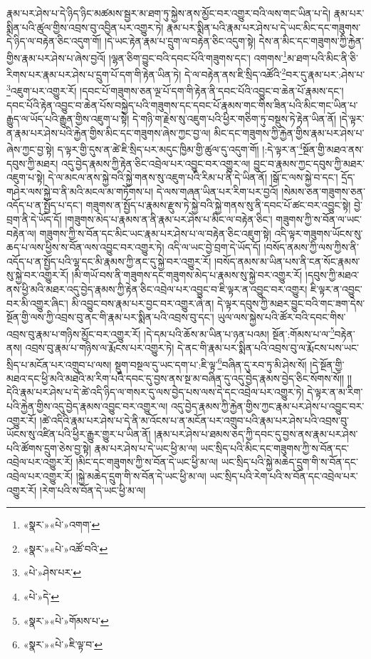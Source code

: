 རྣམ་པར་ཤེས་པ་དེ་ཉིད་ཉིང་མཚམས་སྦྱར་མ་ཐག་ཏུ་སྐྱེས་ནས་མྱོང་བར་འགྱུར་བའི་ལས་གང་ཡིན་པ་དེ། རྣམ་པར་སྨིན་པའི་ཚུལ་གྱིས་འབྲས་བུ་འབྱིན་པར་འགྱུར་ཏེ། རྣམ་པར་སྨིན་པའི་རྣམ་པར་ཤེས་པ་དེ་ཡང་མིང་དང་གཟུགས་དེ་ཉིད་ལ་བརྟེན་ཅིང་འདུག་གོ། །དེ་ཡང་རྟེན་རྣམ་པ་དྲུག་ལ་བརྟེན་ཅིང་འདུག་སྟེ། དེས་ན་མིང་དང་གཟུགས་ཀྱི་རྐྱེན་གྱིས་རྣམ་པར་ཤེས་པ་ཞེས་བྱའོ། །ལྷན་ཅིག་བྱུང་བའི་དབང་པོའི་གཟུགས་དང་། འགགས་\footnote{«སྣར་»«པེ་»འགག་}མ་ཐག་པའི་མིང་ནི་ཅི་རིགས་པར་རྣམ་པར་ཤེས་པ་དྲུག་པོ་དག་གི་རྟེན་ཡིན་ཏེ། དེ་ལ་བརྟེན་ནས་ཇི་སྲིད་འཚོའི་\footnote{«སྣར་»«པེ་»འཚོ་བའི་}བར་དུ་རྣམ་པར་:ཤེས་པ་\footnote{«པེ་»ཤེས་པར་}འཇུག་པར་འགྱུར་རོ། །དབང་པོ་གཟུགས་ཅན་ལྔ་པོ་དག་གི་རྟེན་ནི་དབང་པོའི་འབྱུང་བ་ཆེན་པོ་རྣམས་དང་། དབང་པོའི་རྟེན་འབྱུང་བ་ཆེན་པོས་བསྐྱེད་པའི་གཟུགས་དང་དབང་པོ་རྣམས་གང་གིས་ཟིན་པའི་མིང་གང་ཡིན་པ་རྒྱུད་ལ་ཡོད་པའི་རྒྱུན་གྱིས་འཇུག་པ་སྟེ། དེ་གཉི་ག་རྗེས་སུ་འཇུག་པའི་ཕྱིར་གཅིག་ཏུ་བསྡུས་ཏེ་རྟེན་ཡིན་ནོ། །དེ་ལྟར་ན་རྣམ་པར་ཤེས་པའི་རྐྱེན་གྱིས་མིང་དང་གཟུགས་ཞེས་ཀྱང་བྱ་ལ། མིང་དང་གཟུགས་ཀྱི་རྐྱེན་གྱིས་རྣམ་པར་ཤེས་པ་ཞེས་ཀྱང་བྱ་སྟེ། ད་ལྟར་གྱི་དུས་ན་ཚེ་ཇི་སྲིད་པར་མདུང་ཁྱིམ་གྱི་ཚུལ་དུ་འདུག་གོ། །:དེ་ལྟར་ན་\footnote{«པེ་»དེ་}སྔོན་གྱི་མཐའ་ནས་དབུས་ཀྱི་མཐར། འདུ་བྱེད་རྣམས་ཀྱི་རྟེན་ཅིང་འབྲེལ་པར་འབྱུང་བར་འགྱུར་ལ། བྱུང་བ་རྣམས་ཀྱང་དབུས་ཀྱི་མཐར་འཇུག་པ་སྟེ། དེ་ལ་མངལ་ནས་སྐྱེ་བའི་སྐྱེ་གནས་སུ་འཇུག་པའི་རིམ་པ་ནི་དེ་ཡིན་ནོ། །སྒོ་ང་ལས་སྐྱེ་བ་དང་། དྲོད་གཤེར་ལས་སྐྱེ་བ་ནི་མའི་མངལ་མ་གཏོགས་པ། དེ་ལས་གཞན་ཡིན་པར་རིག་པར་བྱའོ། །སེམས་ཅན་གཟུགས་ཅན་འདོད་པ་ན་སྤྱོད་པ་དང་། གཟུགས་ན་སྤྱོད་པ་རྣམས་རྫུས་ཏེ་སྐྱེ་བའི་སྐྱེ་གནས་སུ་ནི་དབང་པོ་ཚང་བར་འབྱུང་སྟེ། བྱེ་བྲག་ནི་དེ་ཡོད་དོ། །གཟུགས་མེད་པ་རྣམས་ན་ནི་རྣམ་པར་ཤེས་པ་མིང་ལ་བརྟེན་ཅིང་། གཟུགས་ཀྱི་ས་བོན་ལ་ཡང་བརྟེན་ལ། གཟུགས་ཀྱི་ས་བོན་དང་མིང་ཡང་རྣམ་པར་ཤེས་པ་ལ་བརྟེན་ཅིང་འཇུག་སྟེ། འདི་ལྟར་གཟུགས་ཡོངས་སུ་ཆད་པ་ལས་ཕྱིས་ས་བོན་ལས་འབྱུང་བར་འགྱུར་ཏེ། འདི་ལ་ཡང་བྱེ་བྲག་དེ་ཡོད་དོ། །བསོད་ནམས་ཀྱི་ལས་ཀྱིས་ནི་འདོད་པ་ན་སྤྱོད་པའི་ལྷ་དང་མི་རྣམས་ཀྱི་ནང་དུ་སྐྱེ་བར་འགྱུར་རོ། །བསོད་ནམས་མ་ཡིན་པས་ནི་ངན་སོང་རྣམས་སུ་སྐྱེ་བར་འགྱུར་རོ། །མི་གཡོ་བས་ནི་གཟུགས་དང་གཟུགས་མེད་པ་རྣམས་སུ་སྐྱེ་བར་འགྱུར་རོ། །དབུས་ཀྱི་མཐའ་ནས་ཕྱི་མའི་མཐར་འདུ་བྱེད་རྣམས་ཀྱི་རྟེན་ཅིང་འབྲེལ་པར་འབྱུང་བ་ཇི་ལྟར་ན་འབྱུང་བར་འགྱུར། ཇི་ལྟར་ན་འབྱུང་བར་མི་འགྱུར་ཞིང་། མི་འབྱུང་བས་རྣམ་པར་བྱང་བར་འགྱུར་ཞེ་ན། དེ་ལྟར་དབུས་ཀྱི་མཐར་བྱུང་བའི་གང་ཟག་དེས་སྔོན་གྱི་ལས་ཀྱི་འབྲས་བུ་ནང་གི་རྣམ་པར་སྨིན་པའི་འབྲས་བུ་དང་། ཡུལ་ལས་སྐྱེས་པའི་ཚོར་བའི་དབང་གིས་འབྲས་བུ་རྣམ་པ་གཉིས་མྱོང་བར་འགྱུར་རོ། །དེ་དམ་པའི་ཆོས་མ་ཡིན་པ་ཉན་པའམ། སྔོན་:གོམས་པ་ལ་\footnote{«སྣར་»«པེ་»གོམས་པ་}བརྟེན་ནས། འབྲས་བུ་རྣམ་པ་གཉིས་ལ་རྨོངས་པར་འགྱུར་ཏེ། དེ་ནང་གི་རྣམ་པར་སྨིན་པའི་འབྲས་བུ་ལ་རྨོངས་པས་ཡང་སྲིད་པ་མངོན་པར་འགྲུབ་པ་ལས། སྡུག་བསྔལ་དུ་ཡང་དག་པ་:ཇི་ལྟ་\footnote{«སྣར་»«པེ་»ཇི་ལྟ་བ་}བཞིན་དུ་རབ་ཏུ་མི་ཤེས་སོ། །དེ་སྔོན་གྱི་མཐའ་དང་ཕྱི་མའི་མཐའི་མ་རིག་པའི་དབང་དུ་བྱས་ནས་སྔ་མ་བཞིན་དུ་འདུ་བྱེད་རྣམས་བྱེད་ཅིང་སོགས་སོ།། །།དེའི་རྣམ་པར་ཤེས་པ་དེ་ཚེ་འདི་ཉིད་ལ་གསར་དུ་ལས་བྱེད་པས་ལས་དེ་དང་འབྲེལ་པར་འགྱུར་ཏེ། དེ་ལྟར་ན་མ་རིག་པའི་རྐྱེན་གྱིས་འདུ་བྱེད་རྣམས་འབྱུང་བར་འགྱུར་ལ། འདུ་བྱེད་རྣམས་ཀྱི་རྐྱེན་གྱིས་ཀྱང་རྣམ་པར་ཤེས་པ་འབྱུང་བར་འགྱུར་རོ། །ཚེ་འདིའི་རྣམ་པར་ཤེས་པ་དེ་ནི་མ་འོངས་པ་ན་མངོན་པར་འགྲུབ་པའི་རྣམ་པར་ཤེས་པའི་འབྲས་བུ་ཡོངས་སུ་འཛིན་པའི་ཕྱིར་རྒྱུར་གྱུར་པ་ཡིན་ནོ། །རྣམ་པར་ཤེས་པ་ཐམས་ཅད་ཀྱི་དབང་དུ་བྱས་ནས་རྣམ་པར་ཤེས་པའི་ཚོགས་དྲུག་ཅེས་བྱ་སྟེ། རྣམ་པར་ཤེས་པ་དེ་ཡང་ཕྱི་མ་ལ། ཡང་སྲིད་པའི་མིང་དང་གཟུགས་ཀྱི་ས་བོན་དང་འབྲེལ་པར་འགྱུར་རོ། །མིང་དང་གཟུགས་ཀྱི་ས་བོན་དེ་ཡང་ཕྱི་མ་ལ། ཡང་སྲིད་པའི་སྐྱེ་མཆེད་དྲུག་གི་ས་བོན་དང་འབྲེལ་པར་འགྱུར་རོ། །སྐྱེ་མཆེད་དྲུག་གི་ས་བོན་དེ་ཡང་ཕྱི་མ་ལ། ཡང་སྲིད་པའི་རེག་པའི་ས་བོན་དང་འབྲེལ་པར་འགྱུར་རོ། །རེག་པའི་ས་བོན་དེ་ཡང་ཕྱི་མ་ལ། 